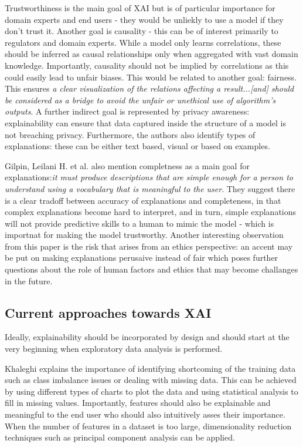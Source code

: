 \documentclass[proposal]{softeng}
\begin{document}
Trustworthiness is the main goal of XAI but is of particular importance for domain experts and end users - they would be unliekly to use a model if they don't trust it. Another goal is causality - this can be of interest primarily to regulators and domain experts. While a model only learns correlations, these should be inferred as causal relationships only when aggregated with vast domain knowledge. Importantly, causality should not be implied by correlations as this could easily lead to unfair biases. This would be related to another goal: fairness. This ensures \textit{a clear visualization of the relations affecting a result...[and] should be considered as a bridge to avoid the unfair or unethical use of algorithm’s outputs}. A further indirect goal is represented by privacy awareness: explainability can ensure that data captured inside the structure of a model is not breaching privacy. Furthermore, the authors also identify types of explanations: these can be either text based, visual or based on examples.

Gilpin, Leilani H. et al.\cite{GilpinLeilaniH} also mention completness as a main goal for explanations:\textit{it must produce descriptions that are simple enough for a person to understand using a vocabulary that is meaningful to the user}. They suggest there is a clear tradoff between accuracy of explanations and completeness, in that complex explanations become hard to interpret, and in turn, simple explanations will not provide predictive skills to a human to mimic the model - which is importnat for making the model trustworthy. Another interesting observation from this paper is the risk that arises from an ethics perspective: an accent may be put on making explanations perusaive instead of fair which poses further questions about the role of human factors and ethics that may become challanges in the future.

\subsection{Current approaches towards XAI}
Ideally, explainability should be incorporated by design and should start at the very beginning when exploratory data analysis is performed. 

Khaleghi \cite{khaleghi} explains the importance of identifying shortcoming of the training data such as class imbalance issues or dealing with missing data. This can be achieved by using different types of charts to plot the data and using statistical analysis to fill in missing values. Importantly, features should also be explainable and meaningful to the end user who should also intuitively asses their importance. When the number of features in a dataset is too large, dimensionality reduction techniques such as principal component analysis can be applied.
\end{document}
